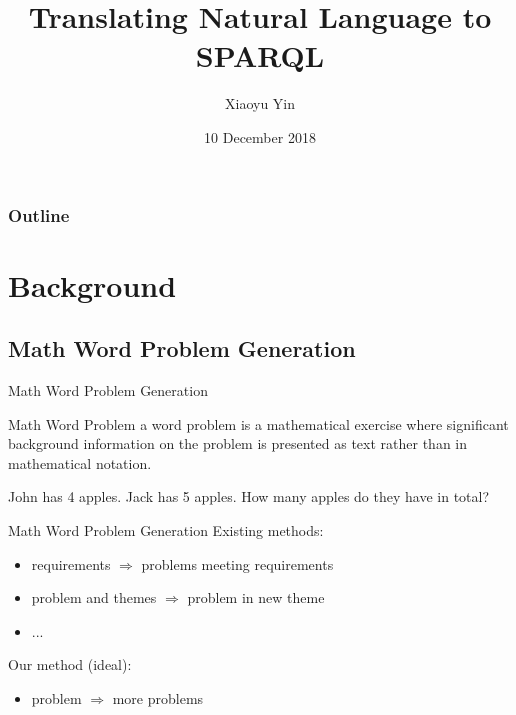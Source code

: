 \documentclass[11pt]{beamer}
\author{Xiaoyu Yin}
\title{Translating Natural Language to SPARQL}
\institute{TU Dresden}
\date{10 December 2018}
\begin{document}

\begin{frame}
    \titlepage
\end{frame}

\begin{frame}
    \frametitle{Outline}
    \tableofcontents[hideallsubsections]
\end{frame}

\section{Background}

\subsection{Math Word Problem Generation}
\begin{frame}{Math Word Problem Generation}
    \begin{block}{Math Word Problem}
        a word problem is a mathematical exercise where significant background information on the problem is presented as text rather than in mathematical notation.
    \end{block}
    \begin{example}
    John has 4 apples. Jack has 5 apples. How many apples do they have in total?
    \end{example}
\end{frame}

\begin{frame}{Math Word Problem Generation}
    Existing methods:
    \begin{itemize}
    \item requirements $\Rightarrow$ problems meeting requirements
    \item problem and themes $\Rightarrow$ problem in new theme
    \item ...
    \end{itemize}
    Our method (ideal):
    \begin{itemize}
    \item problem $\Rightarrow$ more problems
    \end{itemize}
\end{frame}
\end{document}
